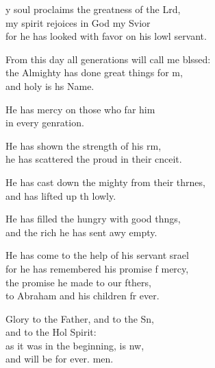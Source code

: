 \settowidth{\versewidth}{From this day all generations will call me blessed: +}
\begin{psalmverse}%
  \begin{patverse}
y soul proclaims the greatness of the Lrd,\Flex\\
my spirit rejoices in God my Svior\Med\\
for he has looked with favor on his lowl servant.

From this day all generations will call me blssed:\Flex\\
the Almighty has done great things for m,\Med\\
and holy is h\pointup{\i}s Name.

He has mercy on those who far him\Med\\
in every genration.

He has shown the strength of his rm,\Med\\
he has scattered the proud in their cnceit.

He has cast down the mighty from their thrnes,\Med\\
and has lifted up th lowly.

He has filled the hungry with good thngs,\Med\\
and the rich he has sent awy empty.

He has come to the help of his servant srael\Med\\
for he has remembered his promise f mercy,\\
the promise he made to our fthers,\Med\\
to Abraham and his children fr ever.

Glory to the Father, and to the Sn,\Med\\
and to the Hol Spirit:\\
as it was in the beginning, is nw,\Med\\
and will be for ever. men.
  \end{patverse}
\end{psalmverse}
